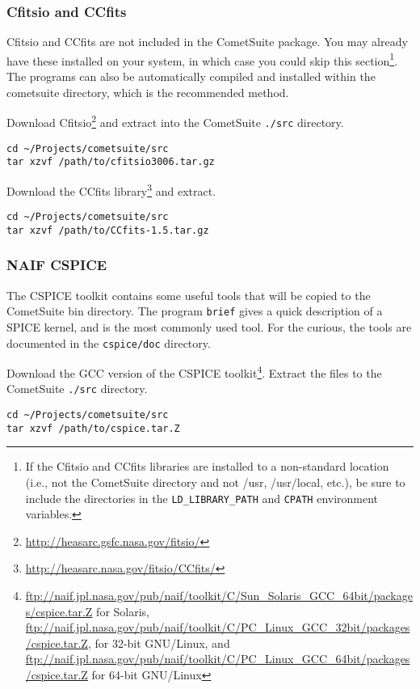 \documentclass[12pt,letterpaper]{article}
\newcommand\cs{CometSuite}
\begin{document}
\subsubsection{Cfitsio and CCfits}

Cfitsio and CCfits are not included in the \cs{} package.  You may
already have these installed on your system, in which case you could
skip this section\footnote{If the Cfitsio and CCfits libraries are
  installed to a non-standard location (i.e., not the \cs{} directory
  and not /usr, /usr/local, etc.), be sure to include the directories in
  the \texttt{LD\_LIBRARY\_PATH} and \texttt{CPATH} environment
  variables.}.  The programs can also be automatically compiled and
installed within the cometsuite directory, which is the recommended
method.

Download Cfitsio\footnote{\url{http://heasarc.gsfc.nasa.gov/fitsio/}}
and extract into the \cs{} \texttt{./src} directory.
\begin{lstlisting}
cd ~/Projects/cometsuite/src
tar xzvf /path/to/cfitsio3006.tar.gz
\end{lstlisting}

Download the CCfits
library\footnote{\url{http://heasarc.nasa.gov/fitsio/CCfits/}} and extract.
\begin{lstlisting}
cd ~/Projects/cometsuite/src
tar xzvf /path/to/CCfits-1.5.tar.gz
\end{lstlisting}

\subsubsection{NAIF CSPICE}
The CSPICE toolkit contains some useful tools that will be copied to
the \cs{} bin directory.  The program \texttt{brief} gives a quick
description of a SPICE kernel, and is the most commonly used tool.
For the curious, the tools are documented in the \texttt{cspice/doc}
directory.

Download the GCC version of the CSPICE
toolkit\footnote{\url{ftp://naif.jpl.nasa.gov/pub/naif/toolkit/C/Sun_Solaris_GCC_64bit/packages/cspice.tar.Z}
for Solaris,
\url{ftp://naif.jpl.nasa.gov/pub/naif/toolkit/C/PC_Linux_GCC_32bit/packages/cspice.tar.Z},
for 32-bit GNU/Linux, and
\url{ftp://naif.jpl.nasa.gov/pub/naif/toolkit/C/PC_Linux_GCC_64bit/packages/cspice.tar.Z}
for 64-bit GNU/Linux}.  Extract the files to the \cs{} \texttt{./src}
directory.
\begin{lstlisting}
cd ~/Projects/cometsuite/src
tar xzvf /path/to/cspice.tar.Z
\end{lstlisting}
\end{document}
